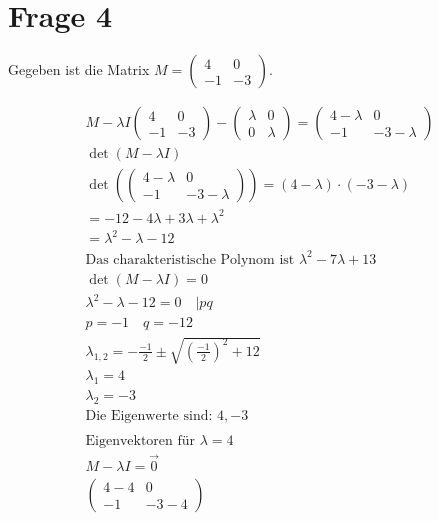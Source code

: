 \section{Frage 4}
Gegeben ist die Matrix $M = \begin{pmatrix}
    4 & 0 \\ -1 & -3
\end{pmatrix}$.

\begin{align*}
    M - \lambda I
    \begin{pmatrix}
        4 & 0 \\ -1 & -3
    \end{pmatrix} - \begin{pmatrix}
        \lambda & 0 \\
        0 & \lambda
    \end{pmatrix} = \begin{pmatrix}
        4 - \lambda & 0 \\ -1 & -3 - \lambda
    \end{pmatrix}\\
    \det\left(M - \lambda I\right) \\
    \det\left(\begin{pmatrix}
        4 - \lambda & 0 \\ -1 & -3 - \lambda
    \end{pmatrix}\right) = (4 - \lambda) \cdot (-3 - \lambda)\\
    = -12 - 4\lambda + 3\lambda + \lambda^2 \\
    = \lambda^2 - \lambda - 12\\
    \text{Das charakteristische Polynom ist } \lambda^2 - 7\lambda + 13 \\
    \det(M - \lambda I) = 0 \\
    \lambda^2 - \lambda - 12 = 0 \quad | pq\\
    p = -1 \quad q = -12 \\
    \lambda_{1, 2} = -\frac{-1}{2} \pm \sqrt{{\left(\frac{-1}{2}\right)}^2 + 12} \\
    \lambda_1 = 4 \\
    \lambda_2 = -3 \\
    \text{Die Eigenwerte sind: }4, -3 \\\\
    \text{Eigenvektoren für } \lambda = 4 \\
    M - \lambda I = \vec{0} \\
    \begin{pmatrix}
        4 - 4 & 0 \\ -1 & -3 - 4

\end{pmatrix}
\end{align*}
